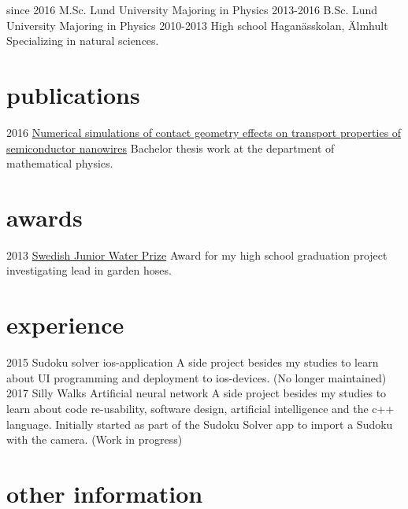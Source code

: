 \documentclass[]{twentysecondcv}
\begin{document}
\begin{twenty}
 \twentyitem
    {since 2016}
    {M.Sc.}
    {Lund University}
    {Majoring in Physics}
  \twentyitem
    {2013-2016}
    {B.Sc.}
    {Lund University}
    {Majoring in Physics}
  \twentyitem
    {2010-2013}
    {High school}
    {Hagan\"asskolan, \"Almhult}
    {Specializing in natural sciences.}
\end{twenty}


\section{publications}

\begin{twentyshort}
  \twentyitemshort
  {2016}
  {\href{http://lup.lub.lu.se/student-papers/record/8878322}{Numerical simulations of contact geometry
    effects on transport properties of semiconductor nanowires}
  Bachelor thesis work at the department of mathematical physics.}
\end{twentyshort}


\section{awards}

\begin{twentyshort}
  \twentyitemshort
    {2013}
    {\href{http://www.siwi.org/latest/vinner-2013-ars-svenska-confidantes/}{Swedish
      Junior Water Prize} Award for my high school graduation project
    investigating lead in garden hoses.}
\end{twentyshort}


\section{experience}

\begin{twenty}
  \twentyitem
    {2015}
    {Sudoku solver}
    {ios-application}
    {A side project besides my studies to learn about UI programming
      and deployment to ios-devices. (No longer maintained)}
\twentyitem
    {2017}
    {Silly Walks}
    {Artificial neural network}
    {A side project besides my studies to learn about code
      re-usability, software design, artificial intelligence and
      the c++ language. Initially started as part of the Sudoku Solver
    app to import a Sudoku with the camera. (Work in progress)}
\end{twenty}

\section{other information}

\end{document}
